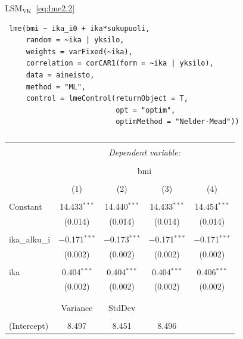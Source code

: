 \documentclass[finnish]{docopts}
\begin{document}
$\text{LSM}_{\text{VK}}$~\ref{eq:lme2.2}\\

\begin{lstlisting}
 lme(bmi ~ ika_i0 + ika*sukupuoli,
     random = ~ika | yksilo,
     weights = varFixed(~ika),
     correlation = corCAR1(form = ~ika | yksilo),
     data = aineisto,
     method = "ML",
     control = lmeControl(returnObject = T,
                          opt = "optim",
                          optimMethod = "Nelder-Mead"))
\end{lstlisting}

\label{appx:opt}

\begin{table}[!htbp] \centering 
  \caption{} 
  \label{} 
\begin{tabular}{@{\extracolsep{5pt}}lcccc} 
\\[-1.8ex]\hline 
\hline \\[-1.8ex] 
 & \multicolumn{4}{c}{\textit{Dependent variable:}} \\ 
\cline{2-5} 
\\[-1.8ex] & \multicolumn{4}{c}{bmi} \\ 
\\[-1.8ex] & (1) & (2) & (3) & (4)\\ 
\hline \\[-1.8ex] 
 Constant & 14.433$^{***}$ & 14.440$^{***}$ & 14.433$^{***}$ & 14.454$^{***}$ \\ 
  & (0.014) & (0.014) & (0.014) & (0.014) \\ 
  & & & & \\ 
 ika\_alku\_i & $-$0.171$^{***}$ & $-$0.173$^{***}$ & $-$0.171$^{***}$ & $-$0.171$^{***}$ \\ 
  & (0.002) & (0.002) & (0.002) & (0.002) \\ 
  & & & & \\ 
 ika & 0.404$^{***}$ & 0.404$^{***}$ & 0.404$^{***}$ & 0.406$^{***}$ \\ 
  & (0.002) & (0.002) & (0.002) & (0.002) \\ 
  & & & & \\ 
\hline \\[-1.8ex] 
  & Variance & StdDev\\
  & & & & \\ 
(Intercept) & 8.497 & 8.451 & 8.496 &\\

\end{tabular}
\end{table}
\end{document}
